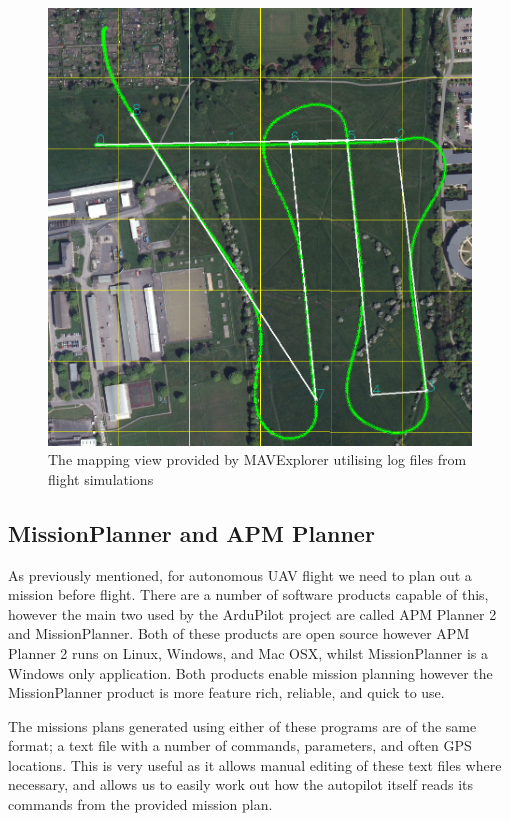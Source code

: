\begin{figure}[htbp!] 
\centering    
\includegraphics[width=\textwidth]{MAVExplorer}
\caption[MAVExplorer Example]{The mapping view provided by MAVExplorer utilising log files from flight simulations}
\label{fig:missionplanner}
\end{figure}

\subsection{MissionPlanner and APM Planner}
\label{intro:planner}

As previously mentioned, for autonomous UAV flight we need to plan out a mission before flight. There are a number of software products capable of this, however the main two used by the ArduPilot project are called APM Planner 2 and MissionPlanner. Both of these products are open source however APM Planner 2 runs on Linux, Windows, and Mac OSX, whilst MissionPlanner is a Windows only application. Both products enable mission planning however the MissionPlanner product is more feature rich, reliable, and quick to use. 

The missions plans generated using either of these programs are of the same format; a text file with a number of commands, parameters, and often GPS locations. This is very useful as it allows manual editing of these text files where necessary, and allows us to easily work out how the autopilot itself reads its commands from the provided mission plan. 

